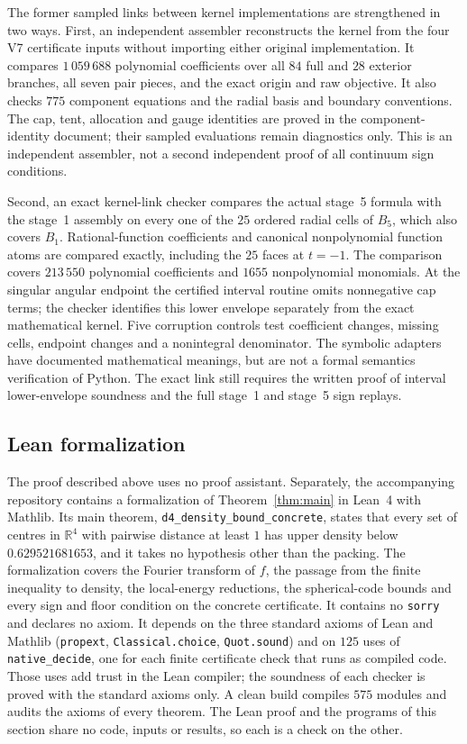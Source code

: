 \documentclass[11pt]{amsart}
\numberwithin{equation}{section}
\theoremstyle{remark}
\newcommand{\R}{\mathbb{R}}
\begin{document}
The former sampled links between kernel implementations are strengthened in two ways. First, an independent assembler reconstructs the kernel from the four V7 certificate inputs without importing either original implementation. It compares $1\,059\,688$ polynomial coefficients over all $84$ full and $28$ exterior branches, all seven pair pieces, and the exact origin and raw objective. It also checks $775$ component equations and the radial basis and boundary conventions. The cap, tent, allocation and gauge identities are proved in the component-identity document; their sampled evaluations remain diagnostics only. This is an independent assembler, not a second independent proof of all continuum sign conditions.

Second, an exact kernel-link checker compares the actual stage~5 formula with the stage~1 assembly on every one of the $25$ ordered radial cells of $B_5$, which also covers $B_1$. Rational-function coefficients and canonical nonpolynomial function atoms are compared exactly, including the $25$ faces at $t=-1$. The comparison covers $213\,550$ polynomial coefficients and $1655$ nonpolynomial monomials. At the singular angular endpoint the certified interval routine omits nonnegative cap terms; the checker identifies this lower envelope separately from the exact mathematical kernel. Five corruption controls test coefficient changes, missing cells, endpoint changes and a nonintegral denominator. The symbolic adapters have documented mathematical meanings, but are not a formal semantics verification of Python. The exact link still requires the written proof of interval lower-envelope soundness and the full stage~1 and stage~5 sign replays.

\subsection*{Lean formalization}
The proof described above uses no proof assistant. Separately, the accompanying repository contains a formalization of Theorem~\ref{thm:main} in Lean~4 with Mathlib. Its main theorem, \texttt{d4\_density\_bound\_concrete}, states that every set of centres in $\R^4$ with pairwise distance at least $1$ has upper density below $0.629521681653$, and it takes no hypothesis other than the packing. The formalization covers the Fourier transform of $f$, the passage from the finite inequality to density, the local-energy reductions, the spherical-code bounds and every sign and floor condition on the concrete certificate. It contains no \texttt{sorry} and declares no axiom. It depends on the three standard axioms of Lean and Mathlib (\texttt{propext}, \texttt{Classical.choice}, \texttt{Quot.sound}) and on $125$ uses of \texttt{native\_decide}, one for each finite certificate check that runs as compiled code. Those uses add trust in the Lean compiler; the soundness of each checker is proved with the standard axioms only. A clean build compiles $575$ modules and audits the axioms of every theorem. The Lean proof and the programs of this section share no code, inputs or results, so each is a check on the other.
\end{document}
